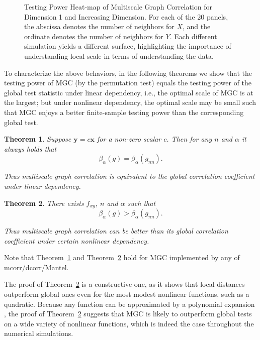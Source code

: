 \documentclass[11pt]{article}
\providecommand{\mb}[1]{\boldsymbol{#1}}
\newtheorem{thm}{Theorem}
\begin{document}
\begin{figure}[htbp]
{}
\caption{Testing Power Heat-map of Multiscale Graph Correlation for Dimension 1 and Increasing Dimension.
For each of the 20 panels, the abscissa denotes the number of neighbors for $X$, and the ordinate denotes the number of neighbors for $Y$.  Each different simulation yields a different surface, highlighting the importance of understanding local scale in terms of understanding the data.}
\label{figSim2}
\end{figure}

To characterize the above behaviors, in the following theorems we show that the testing power of MGC (by the permutation test) equals the testing power of the global test statistic under linear dependency, i.e., the optimal scale of MGC is at the largest; but under nonlinear dependency, the optimal scale may be small such that MGC enjoys a better finite-sample testing power than the corresponding global test. 

\begin{thm}
\label{thm2}
Suppose $\mb{y}=c\mb{x}$ for a non-zero scalar $c$. Then for any $n$ and $\alpha$ it always holds that
\begin{equation}
\beta_{\alpha}(g) = \beta_{\alpha}(g_{nn}).
\end{equation}

Thus multiscale graph correlation is equivalent to the global correlation coefficient under linear dependency.
\end{thm}

\begin{thm}
\label{thm3}
There exists $f_{xy}$, $n$ and $\alpha$ such that 
\begin{equation}
\beta_{\alpha}(g) > \beta_{\alpha}(g_{nn}).
\end{equation}

Thus multiscale graph correlation can be better than its global correlation coefficient under certain nonlinear dependency.
\end{thm}
Note that Theorem~\ref{thm2} and Theorem~\ref{thm3} hold for MGC implemented by any of mcorr/dcorr/Mantel.

The proof of Theorem~\ref{thm3} is a constructive one, as it shows that local distances outperform global ones even for the most modest nonlinear functions, such as a quadratic.  Because any function can be approximated by a polynomial expansion \cite{RudinBook}, the proof of Theorem~\ref{thm3} suggests that MGC is likely to outperform global tests on a wide variety of nonlinear functions, which is indeed the case throughout the numerical simulations.
\end{document}

